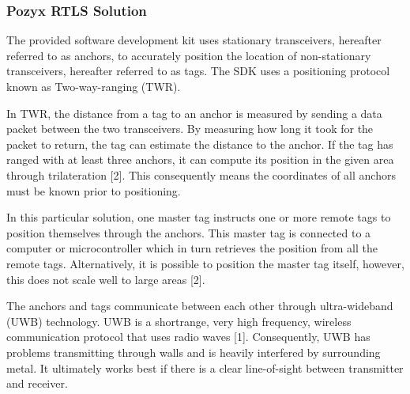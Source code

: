 \documentclass[12pt, a4paper]{article}
\begin{document}
\subsubsection{Pozyx RTLS Solution}
The provided software development kit uses stationary transceivers, hereafter referred to as anchors, to accurately position the location of non-stationary 
transceivers, hereafter referred to as tags. The SDK uses a positioning protocol known as Two-way-ranging (TWR).

In TWR, the distance from a tag to an anchor is measured by sending a data packet between the two transceivers. By measuring how long it took for the 
packet to return, the tag can estimate the distance to the anchor. If the tag has ranged with at least three anchors, it can compute its position in the 
given area through trilateration [2]. This consequently means the coordinates of all anchors must be known prior to positioning.

In this particular solution, one master tag instructs one or more remote tags to position themselves through the anchors. This master tag is 
connected to a computer or microcontroller which in turn retrieves the position from all the remote tags. Alternatively, it is possible to position 
the master tag itself, however, this does not scale well to large areas [2].

The anchors and tags communicate between each other through ultra-wideband (UWB) technology. UWB is a shortrange, very high frequency, wireless 
communication protocol that uses radio waves [1]. Consequently, UWB has problems transmitting through walls and is heavily interfered by surrounding metal. 
It ultimately works best if there is a clear line-of-sight between transmitter and receiver. 
\end{document}
